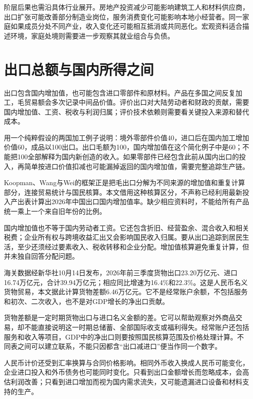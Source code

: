 \documentclass[UTF8,fontset=fandol,zihao=-4,oneside,openany]{ctexbook}
\begin{document}
阶层后果也需沿具体行业展开。房地产投资减少可能影响建筑工人和材料供应商，出口扩张可能改善部分制造业岗位，服务消费变化可能影响本地小经营者。同一家庭如果成员分处不同产业，收入变化还可能相互抵消或共同恶化。宏观资料适合描述环境，家庭处境则需要进一步观察其就业组合与负债。

\section{出口总额与国内所得之间}
出口包含国内增加值，也可能包含进口零部件和原材料。产品在多国之间反复加工，毛贸易额会多次记录中间品价值。评价出口对大陆劳动者和财政的贡献，需要国内增加值、工资、税收与利润归属；评价技术依赖则需要看关键投入来源和替代成本。

\label{arg:P205}
用一个纯粹假设的两国加工例子说明：境外零部件价值40，进口后在国内加工增加价值60，成品以100出口。出口毛额为100，国内增加值在这个简化例子中是60；不能把100全部解释为国内新创造的收入。如果零部件已经包含此前从国内出口的投入，再简单按进口价值扣减也可能漏掉返回的国内增加值，需要完整追踪生产链。

Koopman、Wang与Wei的框架正是把毛出口分解为不同来源的增加值和重复计算部分，连接贸易统计与国民核算。本文借用这种核算区分，不声称已经利用最新投入产出表计算出2026年中国出口国内增加值率。缺少相应资料时，不能给所有产品统一乘上一个来自旧年份的比例。\cite{ValueTradeNBER}

国内增加值也不等于国内劳动者工资。它还包含折旧、经营盈余、混合收入和相关税费；企业所有权与跨境收益汇出又会影响国民收入归属。要从出口追踪到居民生活，至少还须经过要素收入、税收转移和企业分配。增加值核算避免重复计算，但并未独自回答分配问题。

海关数据经新华社10月14日发布，2026年前三季度货物出口23.20万亿元、进口16.74万亿元，合计39.94万亿元；相应同比增速为16.4\%和22.3\%。这是人民币名义货物贸易，本文据此计算货物差额6.46万亿元。它不是经常账户余额，不包括服务和初次、二次收入，也不是对GDP增长的净出口贡献。\cite{Trade2026}

\label{arg:P206}
货物差额是一定时期货物出口与进口名义金额的差。它可以帮助观察对外商品交易，却不能直接说明这一时期总储蓄、全部国际收支或福利得失。经常账户还包括服务和收入等项目，GDP中的净出口则要按照国民核算范围及价格处理计算。不同表之间可以建立联系，不能只因都含“出口减进口”便当作同一个数字。\cite{Trade2026}

人民币计价还受到汇率换算与合同价格影响。相同外币收入换成人民币可能变化，企业进口投入和外币债务也可能同时变化。只看到出口金额增长而忽略成本，会高估利润改善；只看到进口增加而视为国内需求流失，又可能遗漏进口设备和材料支持的生产。
\end{document}
